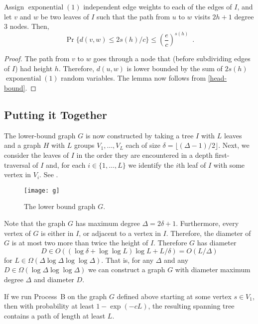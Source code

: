 \documentclass{patmorin}
\DeclareMathOperator{\exponential}{exponential}
\begin{document}
\begin{lem}
   Assign $\exponential(1)$ independent edge weights to each of the edges
   of $I$, and let $v$ and $w$ be two leaves of $I$ such that the path from $u$ to $w$ visits $2h+1$ degree 3 nodes.  Then, 
   \[  
        \Pr\{d(v,w) \le 2s(h)/c  \} \le \left(\frac{e}{c}\right)^{s(h)} \enspace .
   \]
\end{lem}

\begin{proof}
   The path from $v$ to $w$ goes through a node that (before subdividing
   edges of $I$) had height $h$. Therefore, $d(u,w)$ is lower bounded
   by the sum of $2s(h)$ $\exponential(1)$ random variables.  The lemma
   now follows from \eqref{head-bound}.
\end{proof}

\subsection{Putting it Together}

The lower-bound graph $G$ is now constructed by taking a tree $I$ with
$L$ leaves and a graph $H$ with $L$ groups $V_1,\ldots,V_L$ each of
size $\delta=\lfloor(\Delta-1)/2\rfloor$.  Next, we consider the leaves of $I$ in the order they are encountered in a depth first-traversal of $I$ and, for each $i\in\{1,\ldots,L\}$ we identify the $i$th leaf of $I$ with some vertex in $V_i$.  See .

\begin{figure}
  \begin{center}
    \texttt{[image: g]}
  \end{center}
  \caption{The lower bound graph $G$.}
\end{figure}

Note that the graph $G$ has maximum degree $\Delta=2\delta+1$.
Furthermore, every vertex of $G$ is either in $I$, or adjacent to a
vertex in $I$.  Therefore, the diameter of $G$ is at most two more than
twice the height of $I$. Therefore $G$ has diameter
\[
   D\in O((\log\delta + \log\log L)\log L + L/\delta) = O(L/\Delta)
\]
for $L\in\Omega(\Delta\log\Delta\log\log\Delta)$.  That is, for any
$\Delta$ and any $D\in\Omega(\log\Delta\log\log\Delta)$ we can construct
a graph $G$ with diameter maximum degree $\Delta$ and diameter $D$.

\begin{thm}
  If we run Process~B on the graph $G$ defined above starting at some
  vertex $s\in V_1$, then with probability at least $1-\exp(-cL)$,
  the resulting spanning tree contains a path of length at least $L$.
\end{thm}
\end{document}
